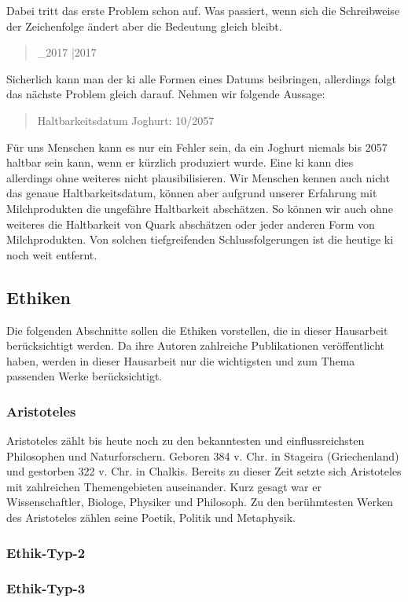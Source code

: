 Dabei tritt das erste Problem schon auf. Was passiert, wenn sich die Schreibweise der Zeichenfolge ändert aber die Bedeutung gleich bleibt.
\begin{quote}
		\_2017	 |2017  
\end{quote}
Sicherlich kann man der \ac{ki} alle Formen eines Datums beibringen, allerdings folgt das nächste Problem gleich darauf. Nehmen wir folgende Aussage:
\begin{quote}
	\quad Haltbarkeitsdatum Joghurt: 10/2057 
\end{quote}
Für uns Menschen kann es nur ein Fehler sein, da ein Joghurt niemals bis 2057 haltbar sein kann, wenn er kürzlich produziert wurde.
Eine \ac{ki} kann dies allerdings ohne weiteres nicht plausibilisieren. Wir Menschen kennen auch nicht das genaue Haltbarkeitsdatum, können aber aufgrund unserer Erfahrung mit Milchprodukten die ungefähre Haltbarkeit abschätzen. So können wir auch ohne weiteres die Haltbarkeit von Quark abschätzen oder jeder anderen Form von Milchprodukten. Von solchen tiefgreifenden Schlussfolgerungen  ist die heutige \ac{ki} noch weit entfernt. 

\subsection{Ethiken}
Die folgenden Abschnitte sollen die Ethiken vorstellen, die in dieser Hausarbeit berücksichtigt werden. 
Da ihre Autoren zahlreiche Publikationen veröffentlicht haben, werden in dieser Hausarbeit nur die wichtigsten und zum Thema passenden Werke berücksichtigt.

\subsubsection{Aristoteles}
Aristoteles zählt bis heute noch zu den bekanntesten und einflussreichsten Philosophen und Naturforschern. Geboren 384 v. Chr. in Stageira (Griechenland) und gestorben 322 v. Chr. in Chalkis. Bereits zu dieser Zeit setzte sich Aristoteles mit zahlreichen Themengebieten auseinander. Kurz gesagt war er Wissenschaftler, Biologe, Physiker und Philosoph. Zu den berühmtesten Werken des Aristoteles zählen seine Poetik, Politik und Metaphysik.

\subsubsection{Ethik-Typ-2}

\subsubsection{Ethik-Typ-3}
